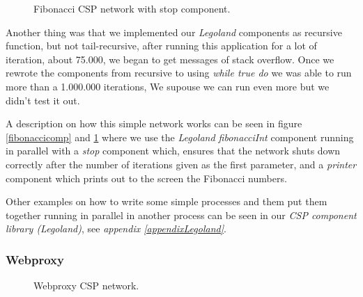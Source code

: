 \documentclass[a4paper,12pt]{article}
\begin{document}
\begin{figure}[h]
  \begin{center}
  \end{center}
  \caption{Fibonacci CSP network with stop component.}
  \label{fibonacci}
\end{figure}

Another thing was that we implemented our {\it Legoland} components as
recursive function, but not tail-recursive, after running this application
for a lot of iteration, about 75.000, we began to get messages of stack
overflow. Once we rewrote the components from recursive to using {\it while true
do} we was able to run more than a 1.000.000 iterations, We supouse we can
run even more but we didn't test it out.

A description on how this simple network works can be seen in figure
\ref{fibonaccicomp} and \ref{fibonacci} where we use the {\it Legoland
fibonacciInt} component running in parallel with a {\it stop} component which,
ensures that the network shuts down correctly after the number of iterations
given as the first parameter, and a {\it printer} component which prints out to
the screen the Fibonacci numbers.

Other examples on how to write some simple processes and them put them together
running in parallel in another process can be seen in our {\it CSP component 
library (Legoland)}, see  {\it appendix \ref{appendixLegoland}}.

\subsubsection{Webproxy}
\begin{figure}[h]
  \begin{center}
  \end{center}
  \caption{Webproxy CSP network.}
  \label{webproxy}
\end{figure}
\end{document}
